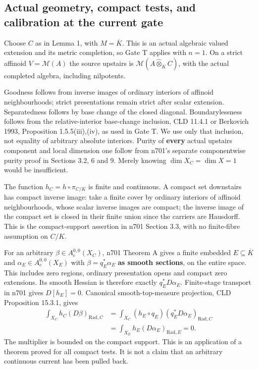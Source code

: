 \documentclass[
  11pt,
]{article}
\begin{document}
\subsection{Actual geometry, compact tests, and calibration at the
current
gate}\label{actual-geometry-compact-tests-and-calibration-at-the-current-gate}

Choose \(C\) as in Lemma 1, with \(M=\overline K\). This is an actual
algebraic valued extension and its metric completion, so Gate T applies
with \(n=1\). On a strict affinoid \(V=\mathcal{M}(A)\) the source
upstairs is \(\mathcal{M}(A\widehat\otimes_K C)\), with the actual
completed algebra, including nilpotents.

Goodness follows from inverse images of ordinary interiors of affinoid
neighbourhoods; strict presentations remain strict after scalar
extension. Separatedness follows by base change of the closed diagonal.
Boundarylessness follows from the relative-interior base-change
inclusion, CLD 11.4.1 or Berkovich 1993, Proposition 1.5.5(iii),(iv), as
used in Gate T. We use only that inclusion, not equality of arbitrary
absolute interiors. Purity of \textbf{every} actual upstairs component
and local dimension one follow from n701's separate componentwise purity
proof in Sections 3.2, 6 and 9. Merely knowing \(\dim X_C=\dim X=1\)
would be insufficient.

The function \(h_C=h\circ\pi_{C/K}\) is finite and continuous. A compact
set downstairs has compact inverse image: take a finite cover by
ordinary interiors of affinoid neighbourhoods, whose scalar inverse
images are compact; the inverse image of the compact set is closed in
their finite union since the carriers are Hausdorff. This is the
compact-support assertion in n701 Section 3.3, with no finite-fibre
assumption on \(C/K\).

For an arbitrary \(\beta\in A_c^{0,0}(X_C)\), n701 Theorem A gives a
finite embedded \(E\subseteq\overline K\) and
\(\alpha_E\in A_c^{0,0}(X_E)\) with \(\beta=q_E^*\alpha_E\) \textbf{as
smooth sections}, on the entire space. This includes zero regions,
ordinary presentation opens and compact zero extensions. Its smooth
Hessian is therefore exactly \(q_E^*D\alpha_E\). Finite-stage transport
in n701 gives \(D[h_E]=0\). Canonical smooth-top-measure projection, CLD
Proposition 15.3.1, gives \[
 \begin{aligned}
 \int_{X_C}h_C(D\beta)_{\mathrm{Rad},C}
 &=\int_{X_C}(h_E\circ q_E)(q_E^*D\alpha_E)_{\mathrm{Rad},C}\\
 &=\int_{X_E}h_E(D\alpha_E)_{\mathrm{Rad},E}=0.
 \end{aligned}                                         \tag{5}
\] The multiplier is bounded on the compact support. This is an
application of a theorem proved for all compact tests. It is not a claim
that an arbitrary continuous current has been pulled back.
\end{document}
